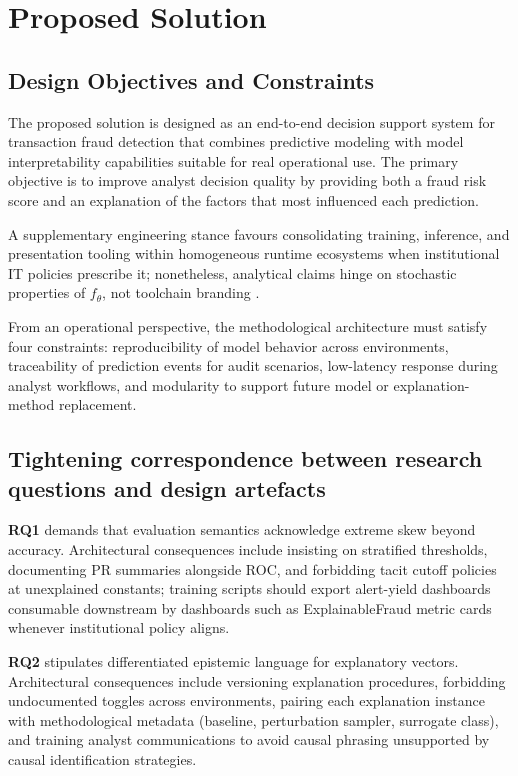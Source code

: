 \chapter{Proposed Solution}

\section{Design Objectives and Constraints}
The proposed solution is designed as an end-to-end decision support system for transaction fraud detection that combines predictive modeling with model interpretability capabilities suitable for real operational use. The primary objective is to improve analyst decision quality by providing both a fraud risk score and an explanation of the factors that most influenced each prediction.

A supplementary engineering stance favours consolidating training, inference, and presentation tooling within homogeneous runtime ecosystems when institutional IT policies prescribe it; nonetheless, analytical claims hinge on stochastic properties of $f_\theta$, not toolchain branding \cite{mldotnet_docs}.

From an operational perspective, the methodological architecture must satisfy four constraints: reproducibility of model behavior across environments, traceability of prediction events for audit scenarios, low-latency response during analyst workflows, and modularity to support future model or explanation-method replacement.

\section{Tightening correspondence between research questions and design artefacts}
\textbf{RQ1} demands that evaluation semantics acknowledge extreme skew beyond accuracy. Architectural consequences include insisting on stratified thresholds, documenting PR summaries alongside ROC, and forbidding tacit cutoff policies at unexplained constants; training scripts should export alert-yield dashboards consumable downstream by dashboards such as ExplainableFraud metric cards whenever institutional policy aligns.

\textbf{RQ2} stipulates differentiated epistemic language for explanatory vectors. Architectural consequences include versioning explanation procedures, forbidding undocumented toggles across environments, pairing each explanation instance with methodological metadata (baseline, perturbation sampler, surrogate class), and training analyst communications to avoid causal phrasing unsupported by causal identification strategies.

